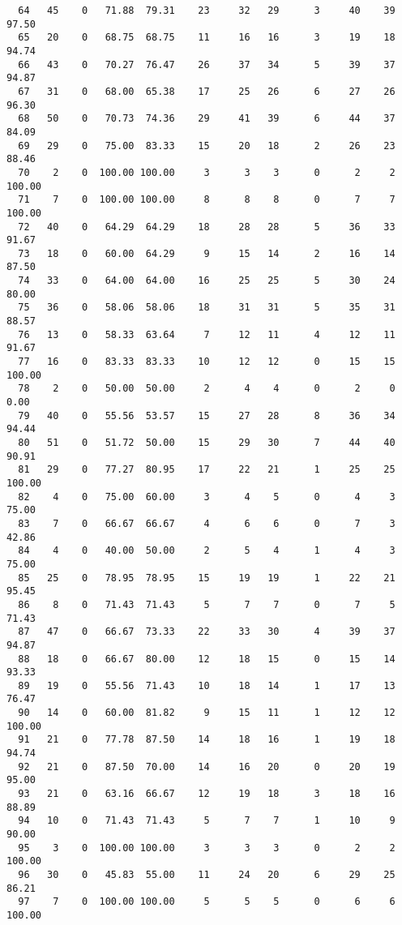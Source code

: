 \begin{verbatim}
  64   45    0   71.88  79.31    23     32   29      3     40    39    97.50
  65   20    0   68.75  68.75    11     16   16      3     19    18    94.74
  66   43    0   70.27  76.47    26     37   34      5     39    37    94.87
  67   31    0   68.00  65.38    17     25   26      6     27    26    96.30
  68   50    0   70.73  74.36    29     41   39      6     44    37    84.09
  69   29    0   75.00  83.33    15     20   18      2     26    23    88.46
  70    2    0  100.00 100.00     3      3    3      0      2     2   100.00
  71    7    0  100.00 100.00     8      8    8      0      7     7   100.00
  72   40    0   64.29  64.29    18     28   28      5     36    33    91.67
  73   18    0   60.00  64.29     9     15   14      2     16    14    87.50
  74   33    0   64.00  64.00    16     25   25      5     30    24    80.00
  75   36    0   58.06  58.06    18     31   31      5     35    31    88.57
  76   13    0   58.33  63.64     7     12   11      4     12    11    91.67
  77   16    0   83.33  83.33    10     12   12      0     15    15   100.00
  78    2    0   50.00  50.00     2      4    4      0      2     0     0.00
  79   40    0   55.56  53.57    15     27   28      8     36    34    94.44
  80   51    0   51.72  50.00    15     29   30      7     44    40    90.91
  81   29    0   77.27  80.95    17     22   21      1     25    25   100.00
  82    4    0   75.00  60.00     3      4    5      0      4     3    75.00
  83    7    0   66.67  66.67     4      6    6      0      7     3    42.86
  84    4    0   40.00  50.00     2      5    4      1      4     3    75.00
  85   25    0   78.95  78.95    15     19   19      1     22    21    95.45
  86    8    0   71.43  71.43     5      7    7      0      7     5    71.43
  87   47    0   66.67  73.33    22     33   30      4     39    37    94.87
  88   18    0   66.67  80.00    12     18   15      0     15    14    93.33
  89   19    0   55.56  71.43    10     18   14      1     17    13    76.47
  90   14    0   60.00  81.82     9     15   11      1     12    12   100.00
  91   21    0   77.78  87.50    14     18   16      1     19    18    94.74
  92   21    0   87.50  70.00    14     16   20      0     20    19    95.00
  93   21    0   63.16  66.67    12     19   18      3     18    16    88.89
  94   10    0   71.43  71.43     5      7    7      1     10     9    90.00
  95    3    0  100.00 100.00     3      3    3      0      2     2   100.00
  96   30    0   45.83  55.00    11     24   20      6     29    25    86.21
  97    7    0  100.00 100.00     5      5    5      0      6     6   100.00

\end{verbatim}
